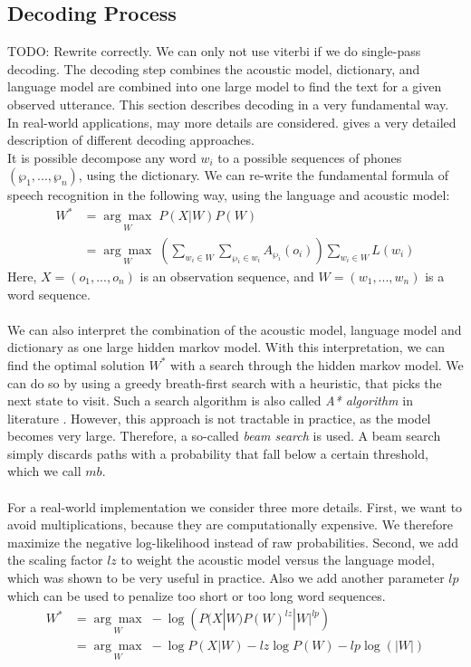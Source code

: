 \subsection{Decoding Process}
TODO: Rewrite correctly. We can only not use viterbi if we do single-pass decoding. 
The decoding step combines the acoustic model, dictionary, and language model are combined into one large model to find the text for a given observed utterance. This section describes decoding in a very fundamental way. In real-world applications, may more details are considered.  \cite{huang2001spoken} gives a very detailed description of different decoding approaches.\\
It is possible decompose any word $w_i$ to a possible sequences of phones $(\wp_1, ..., \wp_n)$, using the dictionary. We can re-write the fundamental formula of speech recognition in the following way, using the language and acoustic model:
\begin{align*}
W^* &= \underset{W}{\arg \max} \; P(X|W) P(W) \\
&= \underset{W}{\arg \max} \; \left( \sum_{w_i \in W} \sum_{\wp_i \in w_i} A_{\wp_i}(o_i) \right) \sum_{w_i \in W} L(w_i)
\end{align*}
Here, $X = (o_1, ..., o_n)$ is an observation sequence, and $W = (w_1, ..., w_n)$ is a word sequence. \\ \\ 
We can also interpret the combination of the acoustic model, language model and dictionary as one large hidden markov model. With this interpretation, we can find the optimal solution $W^*$ with a search through the hidden markov model. We can do so by using a greedy breath-first search with a heuristic, that picks the next state to visit. Such a search algorithm is also called \textit{A* algorithm} in literature \cite{hart1968formal}. However, this approach is not tractable in practice, as the model becomes very large. Therefore, a so-called \textit{beam search} is used. A beam search simply discards paths with a probability that fall below a certain threshold, which we call $mb$. \\ \\
For a real-world implementation we consider three more details. First, we want to avoid multiplications, because they are computationally expensive. We therefore maximize the negative log-likelihood instead of raw probabilities. Second, we add the scaling factor $lz$ to weight the acoustic model versus the language model, which was shown to be very useful in practice. Also we add another parameter $lp$ which can be used to penalize too short or too long word sequences. 
\begin{align*}
W^* &= \underset{W}{\arg \max} \; -\log\left(P(X|W) P(W)^{lz} |W|^{lp} \right) \\
&= \underset{W}{\arg \max} \; -\log P(X|W) - lz\log P(W) -lp\log(|W|) 
\end{align*}

